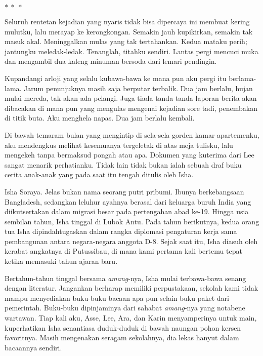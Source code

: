 \documentclass[smalldemyvopaper,11pt,twoside,onecolumn,openright,extrafontsizes]{memoir}
\newcommand\separator{
  \begin{center}
    \(\ast~\ast~\ast\)
  \end{center}
}
\begin{document}
\separator{}


\noindent Seluruh rentetan kejadian yang nyaris tidak bisa dipercaya ini membuat kering mulutku, lalu merayap ke kerongkongan. Semakin jauh kupikirkan, semakin tak masuk akal. Meninggalkan mulas yang tak tertahankan. Kedua mataku perih; jantungku meledak-ledak. Tenanglah, titahku sendiri. Lantas pergi mencuci muka dan mengambil dua kaleng minuman bersoda dari lemari pendingin.


Kupandangi arloji yang selalu kubawa-bawa ke mana pun aku pergi itu berlama-lama. Jarum penunjuknya masih saja berputar terbalik. Dua jam berlalu, hujan mulai mereda, tak akan ada pelangi. Juga tiada tanda-tanda laporan berita akan dibacakan di mana pun yang mengulas mengenai kejadian sore tadi, penembakan di titik buta. Aku menghela napas. Dua jam berlalu kembali.


Di bawah temaram bulan yang mengintip di sela-sela gorden kamar apartemenku, aku mendengkus melihat kesemuanya tergeletak di atas meja tulisku, lalu mengekeh tanpa bermaksud pongah atau apa. Dokumen yang kuterima dari Lee sangat menarik perhatianku. Tidak lain tidak bukan ialah sebuah draf buku cerita anak-anak yang pada saat itu tengah ditulis oleh Isha.

Isha Soraya. Jelas bukan nama seorang putri pribumi. Ibunya berkebangsaan Bangladesh, sedangkan leluhur ayahnya berasal dari keluarga buruh India yang diikutsertakan dalam migrasi besar pada pertengahan abad ke-19. Hingga usia sembilan tahun, Isha tinggal di Lubok Antu. Pada tahun berikutnya, kedua orang tua Isha dipindahtugaskan dalam rangka diplomasi pengaturan kerja sama pembangunan antara negara-negara anggota D-8. Sejak saat itu, Isha diasuh oleh kerabat angkatnya di Putussibau, di mana kami pertama kali bertemu tepat ketika memasuki tahun ajaran baru.



Bertahun-tahun tinggal bersama \textit{amang}-nya, Isha mulai terbawa-bawa senang dengan literatur. Jangankan berharap memiliki perpustakaan, sekolah kami tidak mampu menyediakan buku-buku bacaan apa pun selain buku paket dari pemerintah. Buku-buku dipinjaminya dari sahabat \textit{amang}-nya yang notabene wartawan. Tiap kali aku, Asse, Lee, Ara, dan Karin menyamperinya untuk main, kuperhatikan Isha senantiasa duduk-duduk di bawah naungan pohon kersen favoritnya. Masih mengenakan seragam sekolahnya, dia lekas hanyut dalam bacaannya sendiri.
\end{document}
